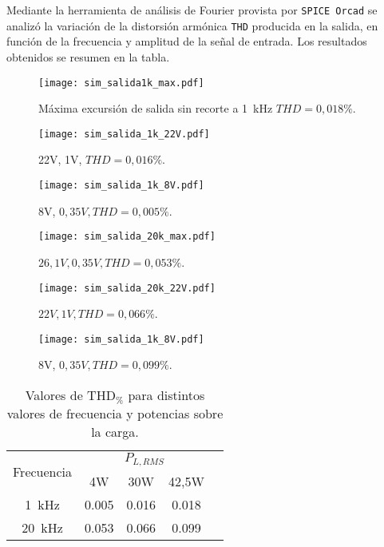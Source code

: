 	Mediante la herramienta de análisis de Fourier provista por \texttt{SPICE Orcad} se analizó la variación de la distorsión armónica \texttt{THD} producida en la salida, en función de la frecuencia y amplitud de la señal de entrada. Los resultados obtenidos se resumen en la tabla.


\begin{figure}[H]
	\centering
	\texttt{[image: sim\_salida1k\_max.pdf]}
	\caption{Máxima excursión de salida sin recorte a \SI{1}{\kilo\hertz} $THD = 0,018\%$.}
	\label{fig:sim_salida_1k_max}
	\end{figure}

\begin{figure}[H]
	\centering
	\texttt{[image: sim\_salida\_1k\_22V.pdf]}
	\caption{22V, 1V, $THD=0,016\%$.}
	\end{figure}

\begin{figure}[H]
	\centering
	\texttt{[image: sim\_salida\_1k\_8V.pdf]}
	\caption{8V, $0,35V, THD=0,005\%$.}
\end{figure}

\begin{figure}[H]
	\centering
	\texttt{[image: sim\_salida\_20k\_max.pdf]}
	\caption{$26,1V, 0,35V, THD=0,053\%$.}
\end{figure}

\begin{figure}[H]
	\centering
	\texttt{[image: sim\_salida\_20k\_22V.pdf]}
	\caption{$22V, 1V, THD=0,066\%$.}
\end{figure}

\begin{figure}[H]
	\centering
	\texttt{[image: sim\_salida\_1k\_8V.pdf]}
	\caption{8V, $0,35V, THD=0,099\%$.}
\end{figure}


\begin{table}[H]
	\centering
	\begin{tabular}{ccccc}
		\toprule
\multirow{2}{*}{Frecuencia} & \multicolumn{3}{c}{$P_{L,RMS}$} \\ 
		\cmidrule{2-4}
			& 4W & 30W & 42,5W \\
		\midrule
		\SI{1}{\kHz} & \num{0,005} & \num{0,016} & \num{0,018} \\
		\SI{20}{\kHz} & \num{0.053} & \num{0,066} & \num{0,099} \\
		\bottomrule
	\end{tabular}
	\caption{Valores de $\mathrm{THD}_{\%}$ para distintos valores de frecuencia y potencias sobre la carga.}
\end{table}




